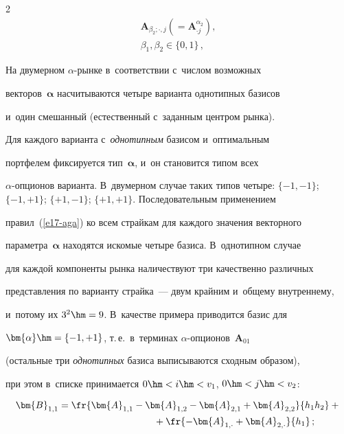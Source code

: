 \begin{multicols}{2}
\begin{multline}
\bm{A}_{\beta_2;\cdot,j}\left( =\bm{A}^{\alpha_2}_{\cdot j}\right),\\


 \beta_1,\beta_2\in  \{0,1\}\,,


\label{e18-aga}


\end{multline}


  


  На двумерном $\alpha$-рын\-ке в~соответствии с~чис\-лом возможных 


векторов~$\bm{\alpha}$ насчитываются четыре варианта однотипных базисов 


и~один смешанный (естественный с~заданным центром рынка). 


  


  Для каждого варианта с~\textit{однотипным} базисом и~оптимальным 


портфелем фиксируется тип~$\bm{\alpha}$, и~он становится типом всех  


$\alpha$-оп\-ци\-онов варианта. В~двумерном случае таких типов четыре: $\{-1, -


1\}$; $\{-1,+1\}$; $\{+1,-1\}$; $\{+1,+1\}$. Последовательным применением 


правил~(\ref{e17-aga}) ко всем страйкам для каж\-до\-го значения векторного 


параметра~$\bm{\alpha}$ находятся искомые четыре базиса. В~однотипном случае 


для каждой компоненты рынка наличествуют три качественно различных 


представления по варианту страйка~--- двум крайним и~общему внутреннему, 


и~потому их $3^2\hm=9$. В~качестве примера приводится базис для 


$\bm{\alpha}\hm=\{-1,+1\}$, т.\,е.\ в~терминах $\alpha$-оп\-ци\-онов~$\bm{A}_{01}$ 


(остальные три \textit{однотипных} базиса выписываются сходным образом), 


при этом в~списке принимается $0\hm<i \hm< v_1$, $0 \hm< j \hm< v_2$: 


  \begin{align*}


  \bm{B}_{1,1}&=\fr{\bm{A}_{1,1}- \bm{A}_{1,2} -


\bm{A}_{2,1}+\bm{A}_{2,2}}{h_1h_2}+{}\\


&\hspace*{35mm}{}+ \fr{-\bm{A}_{1,\cdot} +\bm{A}_{2,\cdot}}{h_1}\,;\\



\end{align*}
\end{multicols}
